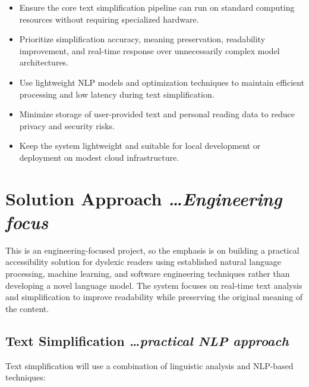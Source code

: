 \documentclass[11pt,a4paper]{article}
\newcommand{\BvrHint}[1]{%
  {\normalfont\normalsize\itshape\hfill #1}}
\begin{document}
\begin{itemize}[leftmargin=0.7cm]

    \item Ensure the core text simplification pipeline can run on standard computing resources without requiring specialized hardware.

    \item Prioritize simplification accuracy, meaning preservation, readability improvement, and real-time response over unnecessarily complex model architectures.

    \item Use lightweight NLP models and optimization techniques to maintain efficient processing and low latency during text simplification.

    \item Minimize storage of user-provided text and personal reading data to reduce privacy and security risks.

    \item Keep the system lightweight and suitable for local development or deployment on modest cloud infrastructure.

\end{itemize}

\section{Solution Approach %
\BvrHint{\ldots Engineering focus}}

This is an engineering-focused project, so the emphasis is on building a practical accessibility solution for dyslexic readers using established natural language processing, machine learning, and software engineering techniques rather than developing a novel language model. The system focuses on real-time text analysis and simplification to improve readability while preserving the original meaning of the content.

\subsection{Text Simplification %
\BvrHint{\ldots practical NLP approach}}

Text simplification will use a combination of linguistic analysis and NLP-based techniques:
\end{document}
